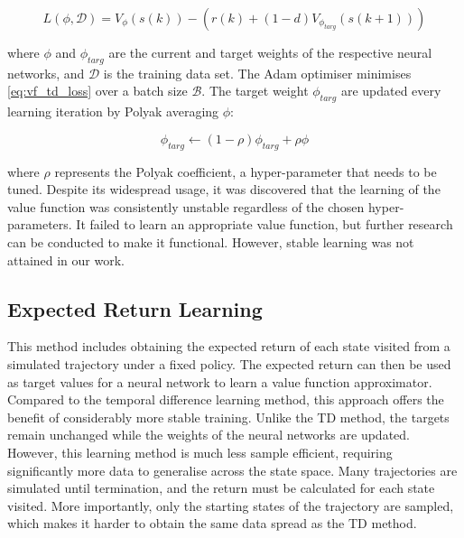 \begin{equation}\label{eq:vf_td_loss}
    L(\phi, \mathcal{D}) =  V_{\phi}(s(k)) - (r(k) + (1-d) V_{\phi_{targ}} (s(k+1)))
\end{equation}

where  $\phi$ and $\phi_{targ}$ are the current and target weights of the respective neural networks, and $\mathcal{D}$ is the training data set. The Adam optimiser minimises \autoref{eq:vf_td_loss} over a batch size $\mathcal{B}$. The target weight $\phi_{targ}$ are updated every learning iteration by Polyak averaging $\phi$:

\begin{equation}
    \phi_{targ} \leftarrow (1 - \rho) \phi_{targ} + \rho \phi
\end{equation}

where $\rho$ represents the Polyak coefficient, a hyper-parameter that needs to be tuned. Despite its widespread usage, it was discovered that the learning of the value function was consistently unstable regardless of the chosen hyper-parameters. It failed to learn an appropriate value function, but further research can be conducted to make it functional. However, stable learning was not attained in our work.

\subsection{Expected Return Learning}
This method includes obtaining the expected return of each state visited from a simulated trajectory under a fixed policy. The expected return can then be used as target values for a neural network to learn a value function approximator. Compared to the temporal difference learning method, this approach offers the benefit of considerably more stable training. Unlike the TD method, the targets remain unchanged while the weights of the neural networks are updated. However, this learning method is much less sample efficient, requiring significantly more data to generalise across the state space. Many trajectories are simulated until termination, and the return must be calculated for each state visited. More importantly, only the starting states of the trajectory are sampled, which makes it harder to obtain the same data spread as the TD method.

